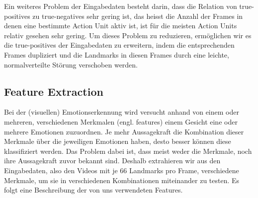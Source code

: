 Ein weiteres Problem der Eingabedaten besteht darin, dass die Relation von true-positives zu true-negatives sehr gering ist, das heisst die Anzahl der Frames
in denen eine bestimmte Action Unit aktiv ist, ist für die meisten Action Units relativ gesehen sehr gering.\newline
Um dieses Problem zu reduzieren, ermöglichen wir es die true-positives der Eingabedaten zu erweitern, indem die entsprechenden Frames dupliziert
und die Landmarks in diesen Frames durch eine leichte, normalverteilte Störung verschoben werden.


\subsection{Feature Extraction}
Bei der (visuellen) Emotionserkennung wird versucht anhand von einem oder mehreren, verschiedenen Merkmalen (engl. features)
einem Gesicht eine oder mehrere Emotionen zuzuordnen. Je mehr Aussagekraft die Kombination dieser Merkmale über die jeweiligen Emotionen haben,
desto besser können diese klassifiziert werden. Das Problem dabei ist, dass meist weder die Merkmale, noch
ihre Aussagekraft zuvor bekannt sind. Deshalb extrahieren wir aus den Eingabedaten, also den Videos mit je 66 Landmarks pro
Frame, verschiedene Merkmale, um sie in verschiedenen Kombinationen miteinander zu testen. Es folgt eine Beschreibung
der von uns verwendeten Features.


